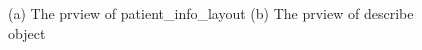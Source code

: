 \documentclass{article}
\begin{document}
\begin{figure}[htb]
  \vspace{\baselineskip}
  \begin{center}
      \caption{(a) The prview of patient\_info\_layout 
      (b) The prview of describe object}
      \label{fig:frontend_patient_info}
  \end{center}
  \vspace{-\baselineskip}
\end{figure}
\end{document}
